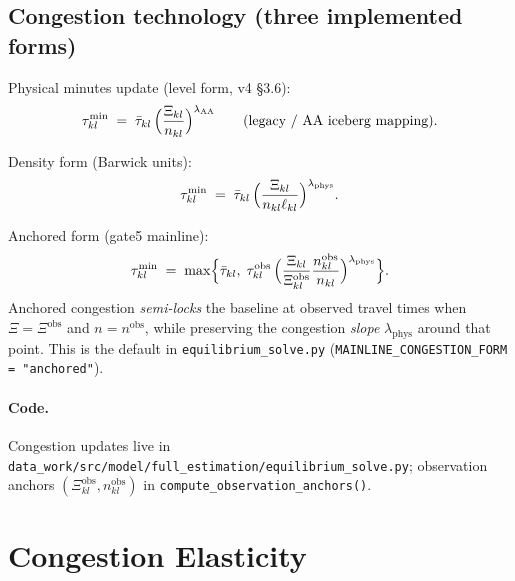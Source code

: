 \documentclass[11pt]{article}
\newcommand{\obs}{\mathrm{obs}}
\newcommand{\phys}{\mathrm{phys}}
\newcommand{\AAcal}{\mathrm{AA}}
\begin{document}
\subsection{Congestion technology (three implemented forms)}

Physical minutes update (level form, v4 \S3.6):
\begin{equation}\label{eq:congestion_legacy}
  \tau^{\min}_{kl}
  \;=\;
  \bar\tau_{kl}\,
  \Bigl(\frac{\Xi_{kl}}{n_{kl}}\Bigr)^{\lambda_{\AAcal}}
  \qquad\text{(legacy / AA iceberg mapping).}
\end{equation}

Density form (Barwick units):
\begin{equation}\label{eq:congestion_density}
  \tau^{\min}_{kl}
  \;=\;
  \bar\tau_{kl}\,
  \Bigl(\frac{\Xi_{kl}}{n_{kl}\ell_{kl}}\Bigr)^{\lambda_{\phys}}.
\end{equation}

Anchored form (gate5 mainline):
\begin{equation}\label{eq:congestion_anchored}
  \tau^{\min}_{kl}
  \;=\;
  \max\Bigl\{
    \bar\tau_{kl},\;
    \tau^{\obs}_{kl}\,
    \Bigl(\frac{\Xi_{kl}}{\Xi^{\obs}_{kl}}\frac{n^{\obs}_{kl}}{n_{kl}}\Bigr)^{\lambda_{\phys}}
  \Bigr\}.
\end{equation}
Anchored congestion \emph{semi-locks} the baseline at observed travel
times when $\Xi=\Xi^{\obs}$ and $n=n^{\obs}$, while preserving the
congestion \emph{slope} $\lambda_{\phys}$ around that point.  This is
the default in \texttt{equilibrium\_solve.py}
(\texttt{MAINLINE\_CONGESTION\_FORM = "anchored"}).

\paragraph{Code.}
Congestion updates live in
\texttt{data\_work/src/model/full\_estimation/equilibrium\_solve.py};
observation anchors $(\Xi^{\obs}_{kl},n^{\obs}_{kl})$ in
\texttt{compute\_observation\_anchors()}.

\section{Congestion Elasticity}\label{sec:lambda}
\end{document}
